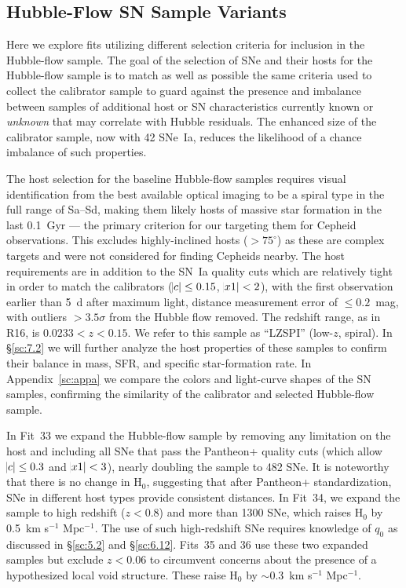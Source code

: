 \documentclass[12pt]{aastex631}
\newcommand{\kms}{km s$^{-1}$ Mpc$^{-1}$}
\begin{document}
\subsection{Hubble-Flow SN Sample Variants\label{sc:6.8}}

Here we explore fits utilizing different selection criteria for inclusion in the Hubble-flow sample. The goal of the selection of SNe and their hosts for the Hubble-flow sample is to match as well as possible the same criteria used to collect the calibrator sample to guard against the presence and imbalance between samples of additional host or SN characteristics currently known or {\it unknown} that may correlate with Hubble residuals.  The enhanced size of the calibrator sample, now with 42 SNe~Ia, reduces the likelihood of a chance imbalance of such properties.

The host selection for the baseline Hubble-flow samples requires visual identification from the best available optical imaging to be a spiral type in the full range of Sa--Sd, making them likely hosts of massive star formation in the last 0.1~Gyr --- the primary criterion for our targeting them for Cepheid observations.  This excludes highly-inclined hosts ($>75^\circ$) as these are complex targets and were not considered for finding Cepheids nearby.  The host requirements are in addition to the SN~Ia quality cuts which are relatively tight in order to match the calibrators ($\abs{c} \leq 0.15$, $\abs{x1} < 2$), with the first observation earlier than 5~d after maximum light, distance measurement error of $\leq 0.2$~mag, with outliers $>3.5\sigma$ from the Hubble flow removed.  The redshift range, as in R16, is $0.0233 < z < 0.15$.  We refer to this sample as ``LZSPI'' (low-$z$, spiral).   In \S\ref{sc:7.2} we will further analyze the host properties of these samples to confirm their balance in mass, SFR, and specific star-formation rate.  In Appendix~\ref{sc:appa} we compare the colors and light-curve shapes of the SN samples, confirming the similarity of the calibrator and selected Hubble-flow sample.

In Fit~33 we expand the Hubble-flow sample by removing any limitation on the host and including all SNe that pass the Pantheon+ quality cuts (which allow $\abs{c} \leq 0.3$ and $\abs{x1} < 3$), nearly doubling the sample to 482 SNe.  It is noteworthy that there is no change in H$_0$, suggesting that after Pantheon+ standardization, SNe in different host types provide consistent distances.  In Fit~34, we expand the sample to high redshift ($z<0.8$) and more than 1300 SNe, which raises H$_0$ by 0.5~\kms.  The use of such high-redshift SNe requires knowledge of $q_0$ as discussed in \S\ref{sc:5.2} and \S\ref{sc:6.12}. Fits~35 and 36 use these two expanded samples but exclude $z<0.06$ to circumvent concerns about the presence of a hypothesized local void structure.  These raise H$_0$ by $\sim 0.3$~\kms.  
\end{document}
